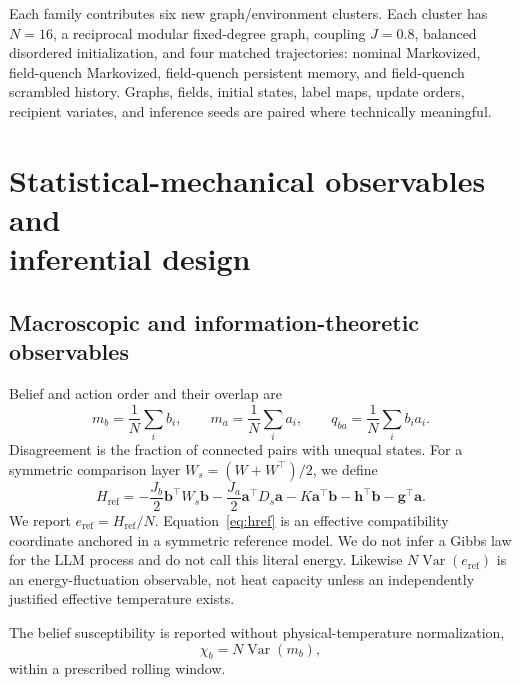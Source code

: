 \documentclass[12pt]{article}
\begin{document}
Each family contributes six new graph/environment clusters.  Each cluster has
$N=16$, a reciprocal modular fixed-degree graph, coupling $J=0.8$, balanced
disordered initialization, and four matched trajectories: nominal Markovized,
field-quench Markovized, field-quench persistent memory, and field-quench
scrambled history.  Graphs, fields, initial states, label maps, update orders,
recipient variates, and inference seeds are paired where technically
meaningful.

\section{Statistical-mechanical observables and\texorpdfstring{\\}{ }inferential design}
\label{sec:observables-inference}

\subsection{Macroscopic and information-theoretic observables}
\label{sec:order-compatibility}

Belief and action order and their overlap are
\begin{equation}
m_b=\frac{1}{N}\sum_i b_i,\qquad
m_a=\frac{1}{N}\sum_i a_i,\qquad
q_{ba}=\frac{1}{N}\sum_i b_i a_i.
\end{equation}
Disagreement is the fraction of connected pairs with unequal states.  For a
symmetric comparison layer $W_s=(W+W^\top)/2$, we define
\begin{equation}
H_{\mathrm{ref}}=-\frac{J_b}{2}\bm b^\top W_s\bm b
-\frac{J_a}{2}\bm a^\top D_s\bm a
-K\bm a^\top\bm b-\bm h^\top\bm b-\bm g^\top\bm a .
\label{eq:href}
\end{equation}
We report $e_{\mathrm{ref}}=H_{\mathrm{ref}}/N$.  Equation~\eqref{eq:href} is
an effective compatibility coordinate anchored in a
symmetric reference model.  We do not infer a Gibbs law for the LLM process
and do not call this literal energy.  Likewise
$N\operatorname{Var}(e_{\mathrm{ref}})$ is an energy-fluctuation observable,
not heat capacity unless an independently justified effective temperature
exists.

The belief susceptibility is reported without physical-temperature
normalization,
\begin{equation}
\chi_b=N\operatorname{Var}(m_b),
\end{equation}
within a prescribed rolling window.
\end{document}
